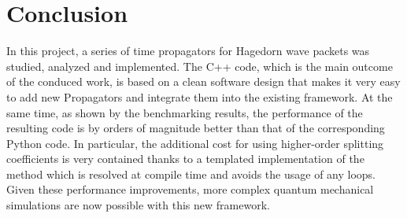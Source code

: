 \section{Conclusion}
%
In this project, a series of time propagators for Hagedorn wave packets was studied, analyzed and implemented.
The C++ code, which is the main outcome of the conduced work, is based on a clean software design that makes it very easy to add new Propagators and integrate them into the existing framework.
At the same time, as shown by the benchmarking results, the performance of the resulting code is by orders of magnitude better than that of the corresponding Python code.
In particular, the additional cost for using higher-order splitting coefficients is very contained thanks to a templated implementation of the  method which is resolved at compile time and avoids the usage of any loops.
Given these performance improvements, more complex quantum mechanical simulations are now possible with this new framework.

